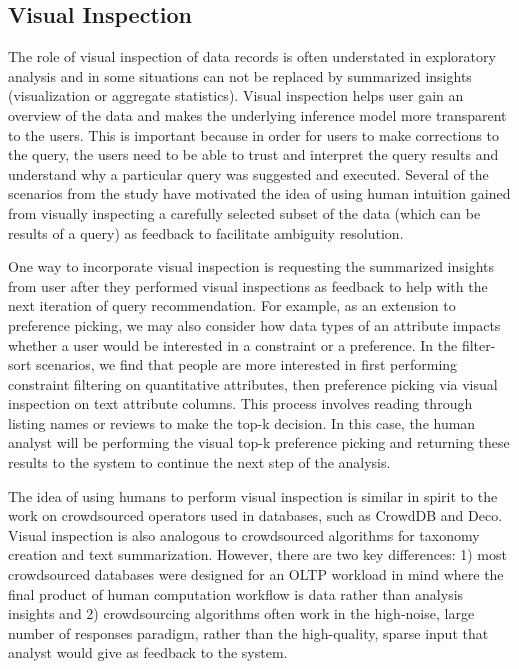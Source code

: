 \documentclass{sig-alternate-05-2015}
\begin{document}
\subsection{Visual Inspection}
  The role of visual inspection of data records is often understated in exploratory analysis and in some situations can not be replaced by summarized insights (visualization or aggregate statistics). Visual inspection helps user gain an overview of the data and makes the underlying inference model more transparent to the users. This is important because in order for users to make corrections to the query, the users need to be able to trust and interpret the query results and understand why a particular query was suggested and executed. Several of the scenarios from the study have motivated the idea of using human intuition gained from visually inspecting a carefully selected subset of the data (which can be results of a query) as feedback to facilitate ambiguity resolution. 
  \par One way to incorporate visual inspection is requesting the summarized insights from user after they performed visual inspections as feedback to help with the next iteration of query recommendation. For example, as an extension to preference picking, we may also consider how data types of an attribute impacts whether a user would be interested in a constraint or a preference. In the filter-sort scenarios, we find that people are more interested in first performing constraint filtering on quantitative attributes, then preference picking via visual inspection on text attribute columns. This process involves reading through listing names or reviews to make the top-k decision. In this case, the human analyst will be performing the visual top-k preference picking and returning these results to the system to continue the next step of the analysis.
  \par The idea of using humans to perform visual inspection is similar in spirit to the work on crowdsourced operators used in databases, such as CrowdDB\cite{CrowdDB} and Deco\cite{Deco}. Visual inspection is also analogous to crowdsourced algorithms for taxonomy creation and text summarization\cite{Chilton2013}. However, there are two key differences: 1) most crowdsourced databases were designed for an OLTP workload in mind where the final product of human computation workflow is data rather than analysis insights and 2) crowdsourcing algorithms often work in the high-noise, large number of responses paradigm, rather than the high-quality, sparse input that analyst would give as feedback to the system.
\end{document}
